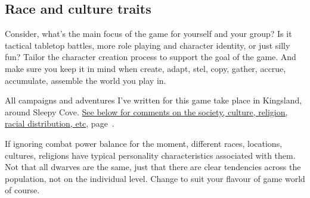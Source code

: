\subsection*{Race and culture traits}
Consider, what's the main focus of the game for yourself and your group? Is it tactical tabletop battles, more role playing and character identity, or just silly fun? Tailor the character creation process to support the goal of the game. And make sure you keep it in mind when create, adapt, stel, copy, gather, accrue, accumulate, assemble the world you play in.

All campaigns and adventures I've written for this game take place in Kingsland, around Sleepy Cove. \hyperref[sec:kingslandsociety]{See below for comments on the society, culture, religion, racial distribution, etc}, page~\pageref{sec:kingslandsociety}.

If ignoring combat power balance for the moment, different races, locations, cultures, religions have typical personality characteristics associated with them. Not that all dwarves are the same, just that there are clear tendencies across the population, not on the individual level. Change to suit your flavour of game world of course.

